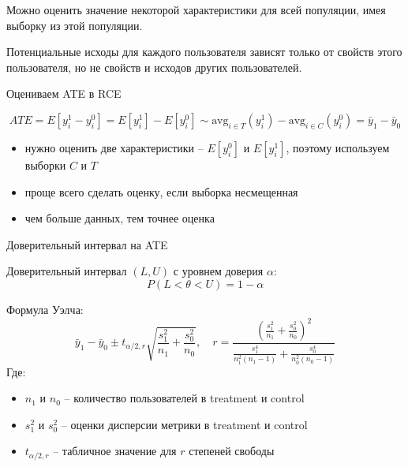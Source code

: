 \documentclass[11pt,aspectratio=169]{beamer}
\begin{document}
\begin{frame}{\phantom{Предположения RCE}}

\begin{tcolorbox}[colback=warn!5,colframe=warn!80,title=Предположение 1: ]
Можно оценить значение некоторой характеристики для всей популяции, имея выборку из этой популяции.
\end{tcolorbox}

\vfill

\begin{tcolorbox}[colback=warn!5,colframe=warn!80,title=Предположение 2: Stable Unit Treatment Value Assumption]
Потенциальные исходы для каждого пользователя зависят только от свойств этого пользователя, но не свойств и исходов других пользователей.
\end{tcolorbox}

\end{frame}

\begin{frame}{Оцениваем ATE в RCE}

\[
ATE = E[y_i^1 - y_i^0] = E[y_i^1] - E[y_i^0] \sim \text{avg}_{i \in T}(y_i^1) - \text{avg}_{i \in C}(y_i^0) = \bar y_1 - \bar y_0
\]

\begin{itemize}
\item нужно оценить две характеристики -- $E[y_i^0]$ и $E[y_i^1]$, поэтому используем выборки $C$ и $T$
\item проще всего сделать оценку, если выборка несмещенная
\item чем больше данных, тем точнее оценка
\end{itemize}

\end{frame}

\begin{frame}{Доверительный интервал на ATE}

Доверительный интервал $(L, U)$ с уровнем доверия $\alpha$:
\[
P(L < \theta < U) = 1 - \alpha
\]

Формула Уэлча:
\[
\bar y_1 - \bar y_0 \pm t_{\alpha/2,r} \sqrt{\frac{s_1^2}{n_1} + \frac{s_0^2}{n_0}}, \quad
r = \frac{ \left( \frac{s_1^2}{n_1} + \frac{s_0^2}{n_0} \right)^2 }{ \frac{s_1^4}{n_1^2 (n_1 - 1)} + \frac{s_0^4}{n_0^2 (n_0 - 1)} }
\]
Где:
\begin{itemize}
\item $n_1$ и $n_0$ -- количество пользователей в treatment и control
\item $s_1^2$ и $s_0^2$ -- оценки дисперсии метрики в treatment и control
\item $t_{\alpha/2,r}$ -- табличное значение для $r$ степеней свободы
\end{itemize}

\end{frame}
\end{document}
